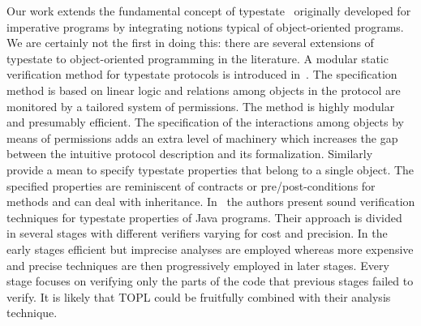 \documentclass[9pt, preprint]{sigplanconf} %
\theoremstyle{definition}
\theoremstyle{remark}
\begin{document}
Our work 
extends the fundamental concept 
of typestate~\cite{strom1986} originally developed for imperative programs
by integrating notions typical of object-oriented programs.
 We are certainly not the first in doing this: there are several extensions of typestate to object-oriented programming in the literature.
A modular static verification method for typestate protocols is introduced in~\cite{dblp:conf/oopsla/bierhoffa07}.
The specification method is based on linear logic and relations among objects in the protocol are monitored by a tailored system of permissions.
The method is highly modular and presumably efficient.
The specification of the interactions among objects by means of permissions adds an extra level of machinery which increases the gap between the intuitive protocol description and its formalization.
Similarly~\cite{deline2004,dblp:conf/sigsoft/BierhoffA05} provide a mean to specify typestate properties that belong to a single object.
The specified properties are reminiscent of contracts or pre/post-conditions for methods and can deal with inheritance.
In~\cite{dblp:conf/issta/FinkYDRG06} the authors present sound verification techniques for typestate properties of Java  programs.
Their approach is divided in several stages with different verifiers varying for cost and precision.
In the early stages efficient but imprecise analyses are employed whereas more expensive and precise techniques are then progressively employed in later stages.
Every stage focuses on verifying only the parts of the code that previous stages failed to verify.
It is likely that  TOPL could be fruitfully combined with their analysis technique.
\end{document}
